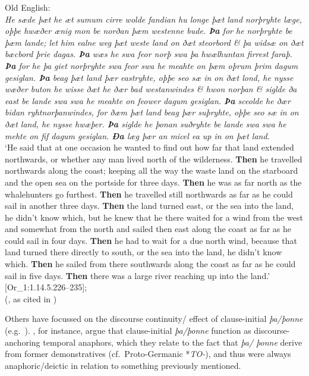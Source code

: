 \documentclass[output=paper,colorlinks,citecolor=brown]{langscibook}
\begin{document}
\ea \label{oe-cont} Old English: \\
{\itshape He sæde þæt he æt sumum cirre wolde fandian hu longe þæt land norþryhte læge, oþþe hwæðer ænig mon be norðan þæm westenne bude. \textbf{Þa} for he norþryhte be þæm lande; let him ealne weg þæt weste land on ðæt steorbord \& þa widsæ on ðæt bæcbord þrie dagas. \textbf{Þa} wæs he swa feor norþ swa þa hwælhuntan firrest faraþ. \textbf{Þa} for he þa giet norþryhte swa feor swa he meahte on þæm oþrum þrim dagum gesiglan. \textbf{Þa} beag þæt land þær eastryhte, oþþe seo sæ in on ðæt lond, he nysse wæðer buton he wisse ðæt he ðær bad westanwindes \& hwon norþan \& siglde ða east be lande swa swa he meahte on feower dagum gesiglan. \textbf{Þa} sceolde he ðær bidan ryhtnorþanwindes, for ðæm þæt land beag þær suþryhte, oþþe seo sæ in on ðæt land, he nysse hwæþer. \textbf{Þa} siglde he þonan suðryhte be lande swa swa he mehte on fif dagum gesiglan. \textbf{Ða} læg þær an micel ea up in on þæt land.}\\
`He said that at one occasion he wanted to find out how far that land extended northwards, or whether any man lived north of the wilderness. \textbf{Then} he travelled northwards along the coast; keeping all the way the waste land on the starboard and the open sea on the portside for three days. \textbf{Then} he was as far north as the whalehunters go furthest. \textbf{Then} he travelled still northwards as far as he could sail in another three days. \textbf{Then} the land turned east, or the sea into the land, he didn't know which, but he knew that he there waited for a wind from the west and somewhat from the north and sailed then east along the coast as far as he could sail in four days. \textbf{Then} he had to wait for a due north wind, because that land turned there directly to south, or the sea into the land, he didn't know which. \textbf{Then} he sailed from there southwards along the coast as far as he could sail in five days. \textbf{Then} there was a large river reaching up into the land.' \hfill [Or\_1:1.14.5.226--235];\\ \hfill (\citealp[234]{enkvist1987old}, as cited in \citealp[179--180]{trips2009syntax})
\z 

\noindent Others have focussed on the discourse continuity/ effect of clause-initial \textit{þa/þonne} (e.g.~\citealp{Los2000,vanKem-Los2006,trips2009syntax}).
\citet{trips2009syntax}, for instance, argue that clause-initial \textit{þa/þonne} function as discourse-anchoring temporal anaphors, which they relate to the fact that \textit{þa/ þonne} derive from former demonstratives (cf.~Proto-Germanic *\textit{TO-}), and thus were always anaphoric/deictic in relation to something previously mentioned.
\end{document}
